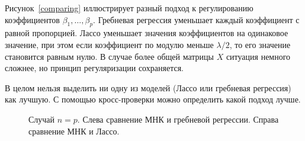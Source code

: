 \documentclass[specialist,
               subf,href,colorlinks=true, 12pt,a4paper]{article} %
\numberwithin{equation}{section}
\begin{document}
Рисунок~\ref{comparing} иллюстрирует разный подход к регулированию коэффициентов $\beta_1, \ldots, \beta_p$. Гребневая регрессия уменьшает каждый коэффициент с равной пропорцией. Лассо уменьшает значения коэффициентов на одинаковое значение, при этом если коэффициент по модулю меньше $\lambda/2$, то его значение становится равным нулю. В случае более общей матрицы $X$ ситуация немного сложнее, но принцип регуляризации сохраняется. 

В целом нельзя выделить ни одну из моделей (Лассо или гребневая регрессия) как лучшую. С помощью кросс-проверки можно определить какой подход лучше.

\begin{figure}[h]
\caption{Случай $n = p$. Слева сравнение МНК и гребневой регрессии. Справа сравнение МНК и Лассо.}
\end{figure}
\label{comparing}
\vspace{-0.3cm}

%
%
\end{document}
